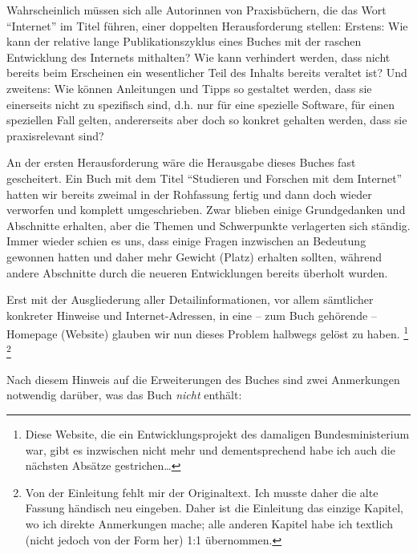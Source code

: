 \documentclass[]{book}
\let\rmarkdownfootnote\footnote%
\def\footnote{\protect\rmarkdownfootnote}
\theoremstyle{definition}
\theoremstyle{definition}
\theoremstyle{definition}
\theoremstyle{remark}
\begin{document}
Wahrscheinlich müssen sich alle Autorinnen von Praxisbüchern, die das
Wort ``Internet'' im Titel führen, einer doppelten Herausforderung
stellen: Erstens: Wie kann der relative lange Publikationszyklus eines
Buches mit der raschen Entwicklung des Internets mithalten? Wie kann
verhindert werden, dass nicht bereits beim Erscheinen ein wesentlicher
Teil des Inhalts bereits veraltet ist? Und zweitens: Wie können
Anleitungen und Tipps so gestaltet werden, dass sie einerseits nicht zu
spezifisch sind, d.h. nur für eine spezielle Software, für einen
speziellen Fall gelten, andererseits aber doch so konkret gehalten
werden, dass sie praxisrelevant sind?

An der ersten Herausforderung wäre die Herausgabe dieses Buches fast
gescheitert. Ein Buch mit dem Titel ``Studieren und Forschen mit dem
Internet'' hatten wir bereits zweimal in der Rohfassung fertig und dann
doch wieder verworfen und komplett umgeschrieben. Zwar blieben einige
Grundgedanken und Abschnitte erhalten, aber die Themen und Schwerpunkte
verlagerten sich ständig. Immer wieder schien es uns, dass einige Fragen
inzwischen an Bedeutung gewonnen hatten und daher mehr Gewicht (Platz)
erhalten sollten, während andere Abschnitte durch die neueren
Entwicklungen bereits überholt wurden.

Erst mit der Ausgliederung aller Detailinformationen, vor allem
sämtlicher konkreter Hinweise und Internet-Adressen, in eine -- zum Buch
gehörende -- Homepage (Website) glauben wir nun dieses Problem halbwegs
gelöst zu haben. \footnote{Diese Website, die ein Entwicklungsprojekt
  des damaligen Bundesministerium war, gibt es inzwischen nicht mehr und
  dementsprechend habe ich auch die nächsten Absätze gestrichen\ldots{}}
\footnote{Von der Einleitung fehlt mir der Originaltext. Ich musste
  daher die alte Fassung händisch neu eingeben. Daher ist die Einleitung
  das einzige Kapitel, wo ich direkte Anmerkungen mache; alle anderen
  Kapitel habe ich textlich (nicht jedoch von der Form her) 1:1
  übernommen.}

Nach diesem Hinweis auf die Erweiterungen des Buches sind zwei
Anmerkungen notwendig darüber, was das Buch \emph{nicht} enthält:
\end{document}
